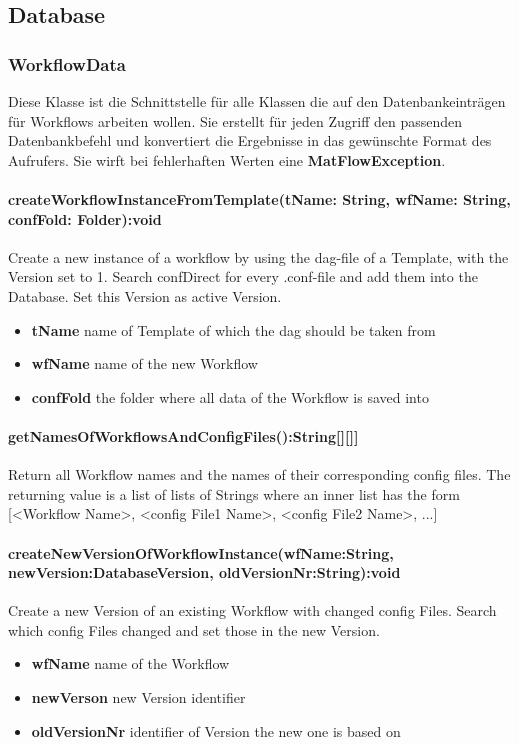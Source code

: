 \subsection{Database}

\subsubsection{WorkflowData}
Diese Klasse ist die Schnittstelle für alle Klassen die auf den Datenbankeinträgen für Workflows arbeiten wollen. Sie erstellt für jeden Zugriff den passenden Datenbankbefehl und konvertiert die Ergebnisse in das gewünschte Format des Aufrufers.
Sie wirft bei fehlerhaften Werten eine \textbf{MatFlowException}.

\paragraph{createWorkflowInstanceFromTemplate(tName: String, wfName: String, confFold: Folder):void}
Create a new instance of a workflow by using the dag-file of a Template, 
with the Version set to 1. 
Search confDirect for every .conf-file and add them into the Database.
Set this Version as active Version.
\begin{itemize}
	\item \textbf{tName}
	name of Template of which the dag should be taken from
	\item \textbf{wfName}
	name of the new Workflow
	\item \textbf{confFold}
	the folder where all data of the Workflow is saved into
\end{itemize}


\paragraph{getNamesOfWorkflowsAndConfigFiles():String[][]]}
Return all Workflow names and the names of their corresponding config files.
The returning value is a list of lists of Strings where an inner list has the form [<Workflow Name>, <config File1 Name>, <config File2 Name>, ...]

\paragraph{createNewVersionOfWorkflowInstance(wfName:String, newVersion:DatabaseVersion, oldVersionNr:String):void}
Create a new Version of an existing Workflow with changed config Files.
Search which config Files changed and set those in the new Version.
\begin{itemize}
	\item \textbf{wfName}
	name of the Workflow
	\item \textbf{newVerson}
	new Version identifier
	\item \textbf{oldVersionNr}
	identifier of Version the new one is based on
\end{itemize}


